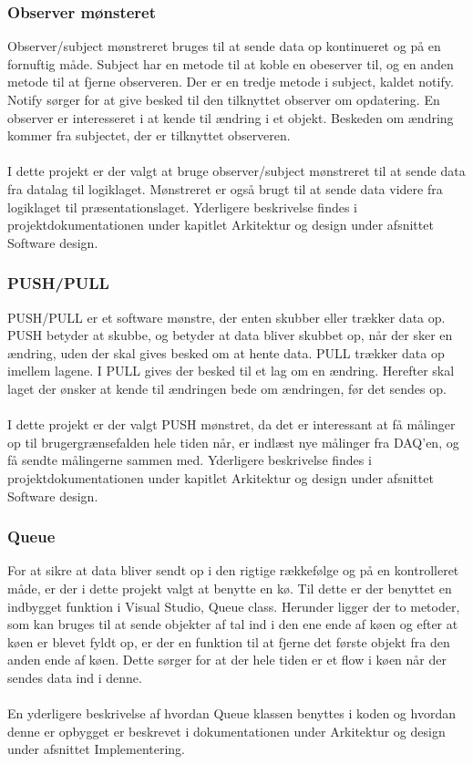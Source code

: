 \subsubsection{Observer mønsteret}
Observer/subject mønstreret bruges til at sende data op kontinueret og på en fornuftig måde. Subject har en metode til at koble en obeserver til, og en anden metode til at fjerne observeren. Der er en tredje metode i subject, kaldet notify. Notify sørger for at give besked til den tilknyttet observer om opdatering. En observer er interesseret i at kende til ændring i et objekt. Beskeden om ændring kommer fra subjectet, der er tilknyttet observeren. \\
\\
I dette projekt er der valgt at bruge observer/subject mønstreret til at sende data fra datalag til logiklaget. Mønstreret er også brugt til at sende data videre fra logiklaget til præsentationslaget. Yderligere beskrivelse findes i projektdokumentationen under kapitlet Arkitektur og design under afsnittet Software design. 
\subsubsection{PUSH/PULL}
PUSH/PULL er et software mønstre, der enten skubber eller trækker data op. PUSH betyder at skubbe, og betyder at data bliver skubbet op, når der sker en ændring, uden der skal gives besked om at hente data. PULL trækker data op imellem lagene. I PULL gives der besked til et lag om en ændring. Herefter skal laget der ønsker at kende til ændringen bede om ændringen, før det sendes op.\\
\\
I dette projekt er der valgt PUSH mønstret, da det er interessant at få målinger op til brugergrænsefalden hele tiden når, er indlæst nye målinger fra DAQ’en, og få sendte målingerne sammen med. Yderligere beskrivelse findes i projektdokumentationen under kapitlet Arkitektur og design under afsnittet Software design. 
\subsubsection{Queue}
For at sikre at data bliver sendt op i den rigtige rækkefølge og på en kontrolleret måde, er der i dette projekt valgt at benytte en kø. Til dette er der benyttet en indbygget funktion i Visual Studio, Queue class. Herunder ligger der to metoder, som kan bruges til at sende objekter af tal ind i den ene ende af køen og efter at køen er blevet fyldt op, er der en funktion til at fjerne det første objekt fra den anden ende af køen. Dette sørger for at der hele tiden er et flow i køen når der sendes data ind i denne. \\
\\
En yderligere beskrivelse af hvordan Queue klassen benyttes i koden og hvordan denne er opbygget er beskrevet i dokumentationen under Arkitektur og design under afsnittet Implementering.
